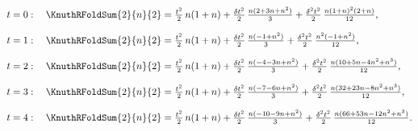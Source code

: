 \begin{example}
  \begin{align*}
    t=0:\quad
    \KnuthRFoldSum{2}{n}{2}
    &=
    \tfrac{t^2}{2}\, n(1+n)
    +
    \tfrac{\delta t^2}{2}\,\tfrac{n(2+3n+n^2)}{3}
    +
    \tfrac{\delta^2 t^2}{2}\,\tfrac{n(1+n)^2(2+n)}{12},
    \\[8pt]
    t=1:\quad
    \KnuthRFoldSum{2}{n}{2}
    &=
    \tfrac{t^2}{2}\, n(1+n)
    +
    \tfrac{\delta t^2}{2}\,\tfrac{n(-1+n^2)}{3}
    +
    \tfrac{\delta^2 t^2}{2}\,\tfrac{n^2(-1+n^2)}{12},
    \\[8pt]
    t=2:\quad
    \KnuthRFoldSum{2}{n}{2}
    &=
    \tfrac{t^2}{2}\, n(1+n)
    +
    \tfrac{\delta t^2}{2}\,\tfrac{n(-4-3n+n^2)}{3}
    +
    \tfrac{\delta^2 t^2}{2}\,\tfrac{n(10+5n-4n^2+n^3)}{12},
    \\[8pt]
    t=3:\quad
    \KnuthRFoldSum{2}{n}{2}
    &=
    \tfrac{t^2}{2}\, n(1+n)
    +
    \tfrac{\delta t^2}{2}\,\tfrac{n(-7-6n+n^2)}{3}
    +
    \tfrac{\delta^2 t^2}{2}\,\tfrac{n(32+23n-8n^2+n^3)}{12},
    \\[8pt]
    t=4:\quad
    \KnuthRFoldSum{2}{n}{2}
    &=
    \tfrac{t^2}{2}\, n(1+n)
    +
    \tfrac{\delta t^2}{2}\,\tfrac{n(-10-9n+n^2)}{3}
    +
    \tfrac{\delta^2 t^2}{2}\,\tfrac{n(66+53n-12n^2+n^3)}{12}.
  \end{align*}
\end{example}
